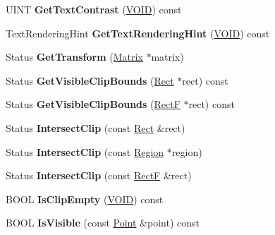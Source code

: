 \begin{DoxyCompactItemize}
U\+I\+NT {\bfseries Get\+Text\+Contrast} (\hyperlink{interfacevoid}{V\+O\+ID}) const
\item 
\mbox{\label{class_graphics_a87cf19c1ab006b7ab1a84bc6c0bc5a09}} 
Text\+Rendering\+Hint {\bfseries Get\+Text\+Rendering\+Hint} (\hyperlink{interfacevoid}{V\+O\+ID}) const
\item 
\mbox{\label{class_graphics_a538dac5418519e6d109aee3e8eafe5ee}} 
Status {\bfseries Get\+Transform} (\hyperlink{class_matrix}{Matrix} $\ast$matrix)
\item 
\mbox{\label{class_graphics_a57ab3d16efa826a3c176cb0b0dd95366}} 
Status {\bfseries Get\+Visible\+Clip\+Bounds} (\hyperlink{struct_rect}{Rect} $\ast$rect) const
\item 
\mbox{\label{class_graphics_ad5255e110e4ee273827042c4ea8236fb}} 
Status {\bfseries Get\+Visible\+Clip\+Bounds} (\hyperlink{struct_rect_f}{RectF} $\ast$rect) const
\item 
\mbox{\label{class_graphics_a2c4a87400ee51f1ff9f1a6335270e7ef}} 
Status {\bfseries Intersect\+Clip} (const \hyperlink{struct_rect}{Rect} \&rect)
\item 
\mbox{\label{class_graphics_a9c706dfb908a779a6eaa01615b8a379d}} 
Status {\bfseries Intersect\+Clip} (const \hyperlink{class_region}{Region} $\ast$region)
\item 
\mbox{\label{class_graphics_a5233e39a82e47024369861410b9d53b4}} 
Status {\bfseries Intersect\+Clip} (const \hyperlink{struct_rect_f}{RectF} \&rect)
\item 
\mbox{\label{class_graphics_af806d0e90da6ec8ed970518171ed9ef7}} 
B\+O\+OL {\bfseries Is\+Clip\+Empty} (\hyperlink{interfacevoid}{V\+O\+ID}) const
\item 
\mbox{\label{class_graphics_a1bb52bb6534db9f7edd2bbdf8dae7711}} 
B\+O\+OL {\bfseries Is\+Visible} (const \hyperlink{struct_point}{Point} \&point) const
\item 
\mbox{\label{class_graphics_a2db22a7f034afc4685af679a6e627ad0}} 

\end{DoxyCompactItemize}
